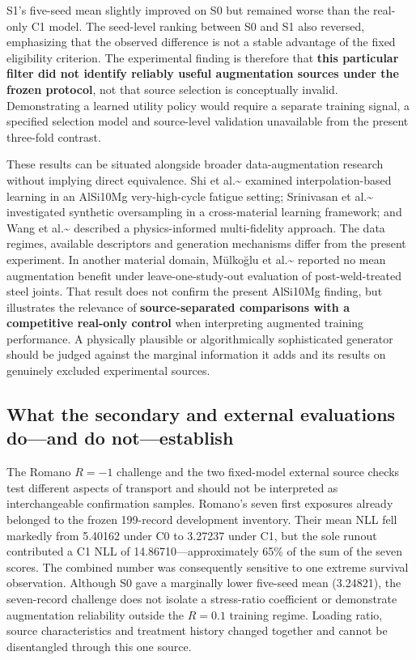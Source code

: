 \documentclass[12pt,a4paper]{article}
\begin{document}
S1's five-seed mean slightly improved on S0 but remained worse than the real-only C1 model. The seed-level ranking between S0 and S1 also reversed, emphasizing that the observed difference is not a stable advantage of the fixed eligibility criterion. The experimental finding is therefore that \textbf{this particular filter did not identify reliably useful augmentation sources under the frozen protocol}, not that source selection is conceptually invalid. Demonstrating a learned utility policy would require a separate training signal, a specified selection model and source-level validation unavailable from the present three-fold contrast.

These results can be situated alongside broader data-augmentation research without implying direct equivalence. Shi et al.\textasciitilde{}\cite{shi2023} examined interpolation-based learning in an AlSi10Mg very-high-cycle fatigue setting; Srinivasan et al.\textasciitilde{}\cite{srinivasan2024} investigated synthetic oversampling in a cross-material learning framework; and Wang et al.\textasciitilde{}\cite{wang2025} described a physics-informed multi-fidelity approach. The data regimes, available descriptors and generation mechanisms differ from the present experiment. In another material domain, Mülkoğlu et al.\textasciitilde{}\cite{mulkoglu2026} reported no mean augmentation benefit under leave-one-study-out evaluation of post-weld-treated steel joints. That result does not confirm the present AlSi10Mg finding, but illustrates the relevance of \textbf{source-separated comparisons with a competitive real-only control} when interpreting augmented training performance. A physically plausible or algorithmically sophisticated generator should be judged against the marginal information it adds and its results on genuinely excluded experimental sources.

\subsection{What the secondary and external evaluations do—and do not—establish}

The Romano \(R=-1\) challenge and the two fixed-model external source checks test different aspects of transport and should not be interpreted as interchangeable confirmation samples. Romano's seven first exposures already belonged to the frozen 199-record development inventory. Their mean NLL fell markedly from 5.40162 under C0 to 3.27237 under C1, but the sole runout contributed a C1 NLL of 14.86710—approximately 65\% of the sum of the seven scores. The combined number was consequently sensitive to one extreme survival observation. Although S0 gave a marginally lower five-seed mean (3.24821), the seven-record challenge does not isolate a stress-ratio coefficient or demonstrate augmentation reliability outside the \(R=0.1\) training regime. Loading ratio, source characteristics and treatment history changed together and cannot be disentangled through this one source.
\end{document}
